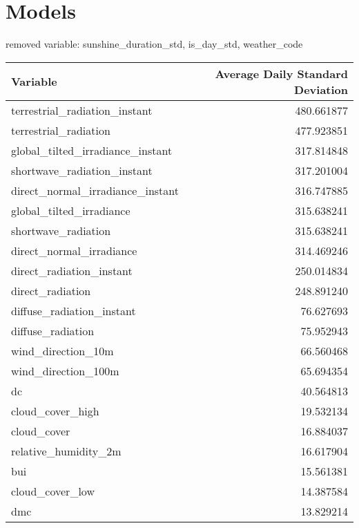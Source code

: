 \chapter{Models}
\label{sec:experiences}



removed variable: sunshine\_duration\_std, is\_day\_std, weather\_code        
\begin{table}[htbp]
	\centering
	\begin{tabular}{l r}
		\hline
		\textbf{Variable} & \textbf{Average Daily Standard Deviation} \\
		\hline
		terrestrial\_radiation\_instant      & 480.661877 \\
		terrestrial\_radiation               & 477.923851 \\
		global\_tilted\_irradiance\_instant  & 317.814848 \\
		shortwave\_radiation\_instant        & 317.201004 \\
		direct\_normal\_irradiance\_instant  & 316.747885 \\
		global\_tilted\_irradiance           & 315.638241 \\
		shortwave\_radiation                 & 315.638241 \\
		direct\_normal\_irradiance           & 314.469246 \\
		direct\_radiation\_instant           & 250.014834 \\
		direct\_radiation                    & 248.891240 \\
		diffuse\_radiation\_instant          & 76.627693 \\
		diffuse\_radiation                   & 75.952943 \\
		wind\_direction\_10m                 & 66.560468 \\
		wind\_direction\_100m                & 65.694354 \\
		dc                                   & 40.564813 \\
		cloud\_cover\_high                   & 19.532134 \\
		cloud\_cover                         & 16.884037 \\
		relative\_humidity\_2m               & 16.617904 \\
		bui                                  & 15.561381 \\
		cloud\_cover\_low                    & 14.387584 \\
		dmc                                  & 13.829214 \\

\end{tabular}
\end{table}

